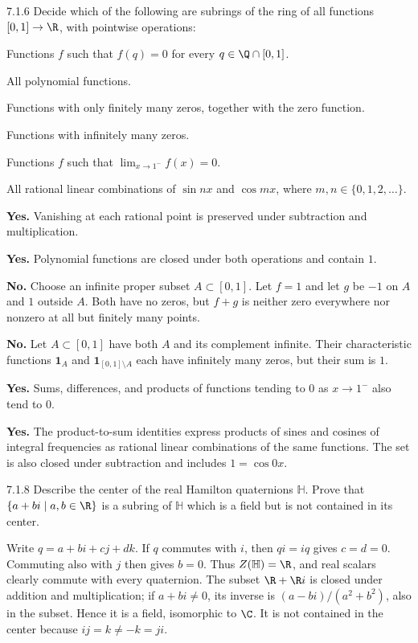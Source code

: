 \documentclass[11pt,oneside]{article}
\begin{document}
\begin{exercise}{7.1.6}
Decide which of the following are subrings of the ring of all functions $[0,1]\to\R$, with pointwise operations:
\begin{exercisesubparts}
\item Functions $f$ such that $f(q)=0$ for every $q\in\Q\cap[0,1]$.
\item All polynomial functions.
\item Functions with only finitely many zeros, together with the zero function.
\item Functions with infinitely many zeros.
\item Functions $f$ such that $\lim_{x\to1^-}f(x)=0$.
\item All rational linear combinations of $\sin nx$ and $\cos mx$, where $m,n\in\{0,1,2,\ldots\}$.
\end{exercisesubparts}
\end{exercise}
\begin{solution}
\begin{exercisesubparts}
\item \textbf{Yes.} Vanishing at each rational point is preserved under subtraction and multiplication.
\item \textbf{Yes.} Polynomial functions are closed under both operations and contain $1$.
\item \textbf{No.} Choose an infinite proper subset $A\subset[0,1]$. Let $f=1$ and let $g$ be $-1$ on $A$ and $1$ outside $A$. Both have no zeros, but $f+g$ is neither zero everywhere nor nonzero at all but finitely many points.
\item \textbf{No.} Let $A\subset[0,1]$ have both $A$ and its complement infinite. Their characteristic functions $\mathbf1_A$ and $\mathbf1_{[0,1]\setminus A}$ each have infinitely many zeros, but their sum is $1$.
\item \textbf{Yes.} Sums, differences, and products of functions tending to $0$ as $x\to1^-$ also tend to $0$.
\item \textbf{Yes.} The product-to-sum identities express products of sines and cosines of integral frequencies as rational linear combinations of the same functions. The set is also closed under subtraction and includes $1=\cos0x$.
\end{exercisesubparts}
\end{solution}

\begin{exercise}{7.1.8}
Describe the center of the real Hamilton quaternions $\mathbb H$. Prove that $\{a+bi\mid a,b\in\R\}$ is a subring of $\mathbb H$ which is a field but is not contained in its center.
\end{exercise}
\begin{solution}
Write $q=a+bi+cj+dk$. If $q$ commutes with $i$, then $qi=iq$ gives $c=d=0$. Commuting also with $j$ then gives $b=0$. Thus $Z(\mathbb H)=\R$, and real scalars clearly commute with every quaternion. The subset $\R+\R i$ is closed under addition and multiplication; if $a+bi\ne0$, its inverse is $(a-bi)/(a^2+b^2)$, also in the subset. Hence it is a field, isomorphic to $\C$. It is not contained in the center because $ij=k\ne-k=ji$.
\end{solution}
\end{document}

